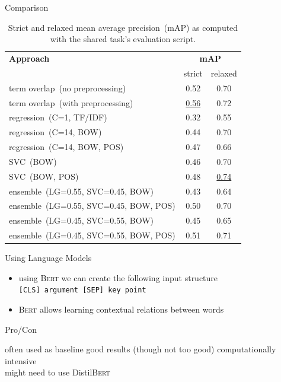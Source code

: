 \documentclass[english,handout]{mlutalk}
\newcommand{\Bert}{\textsc{Bert}\xspace}
\newcommand{\DistilBert}{Distil\textsc{Bert}\xspace}
\newcommand{\TFIDF}{\mbox{TF/IDF}\xspace}
\newcommand{\mAP}{\mbox{mAP}\xspace}
\begin{document}
\begin{frame}{Comparison}
  \begin{table}
    \centering
    \caption{Strict and relaxed mean average precision~(\mAP) as computed with the shared task's evaluation script.}
    \begin{tabular}{lcc}
      \toprule
      \textbf{Approach} & \multicolumn{2}{c}{\textbf{\mAP}} \\
      & strict & relaxed \\
      \midrule
      term overlap~(no preprocessing) & 0.52 & 0.70 \\
      term overlap~(with preprocessing) & \underline{0.56} & 0.72 \\
      regression~(C=1, \TFIDF) & 0.32 & 0.55 \\
      regression~(C=14, BOW) & 0.44 & 0.70 \\
      regression~(C=14, BOW, POS) & 0.47 & 0.66 \\
      SVC~(BOW) & 0.46 & 0.70 \\
      SVC~(BOW, POS) & 0.48 & \underline{0.74} \\
      ensemble~(LG=0.55, SVC=0.45, BOW) & 0.43 & 0.64 \\
      ensemble~(LG=0.55, SVC=0.45, BOW, POS) & 0.50 & 0.70 \\
      ensemble~(LG=0.45, SVC=0.55, BOW) & 0.45 & 0.65 \\
      ensemble~(LG=0.45, SVC=0.55, BOW, POS) & 0.51 & 0.71 \\
      \bottomrule
    \end{tabular}
  \end{table}
\end{frame}

\begin{frame}{Using Language Models}

  \begin{itemize}
    \item using \Bert we can create the following input structure \\
    \lstinline{[CLS] argument [SEP] key point}
    \item \Bert allows learning contextual relations between words
  \end{itemize}

  \begin{block}{Pro/Con}
    \begin{itemize}
      \pro often used as baseline
      \pro good results (though not too good)
      \con computationally intensive \\ might need to use \DistilBert
    \end{itemize}
  \end{block}

\end{frame}
\end{document}
